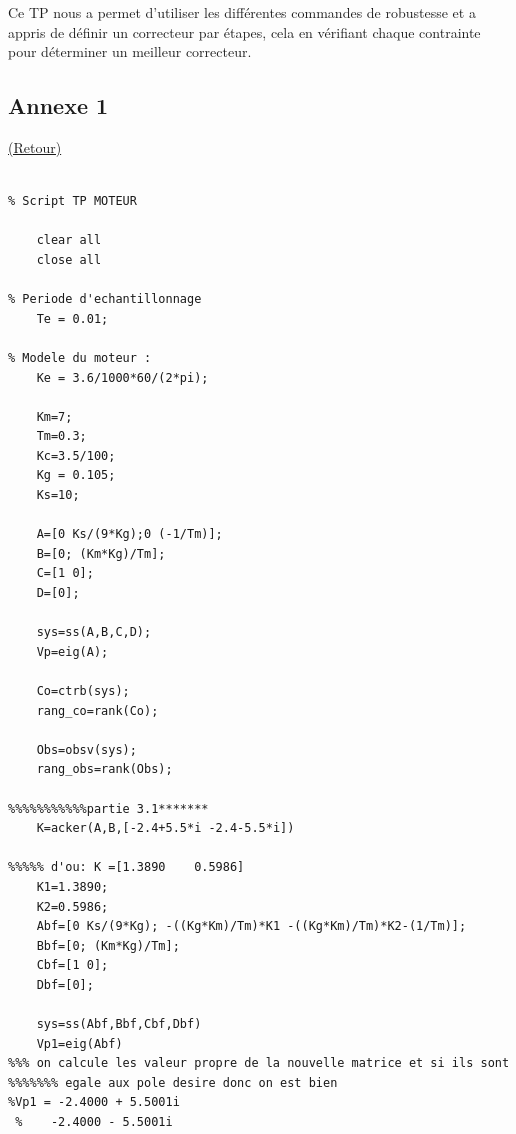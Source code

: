 \documentclass[12pt, a4paper, openany]{report}
\begin{document}
Ce TP nous a permet d'utiliser les différentes commandes de robustesse et a appris de définir un correcteur par étapes, cela en vérifiant chaque contrainte pour déterminer un meilleur correcteur.\\










\begin{appendices}
\chapter*{Annexe 1}
	\hyperref[annexe1]{(Retour)}\label{section1.1}
	
	
\begin{lstlisting}
	
% Script TP MOTEUR

	clear all
	close all

% Periode d'echantillonnage
	Te = 0.01;

% Modele du moteur :
	Ke = 3.6/1000*60/(2*pi);

	Km=7;
	Tm=0.3;
	Kc=3.5/100;
	Kg = 0.105;
	Ks=10;

	A=[0 Ks/(9*Kg);0 (-1/Tm)];
	B=[0; (Km*Kg)/Tm];
	C=[1 0];
	D=[0];

	sys=ss(A,B,C,D);
	Vp=eig(A);

	Co=ctrb(sys);
	rang_co=rank(Co);

	Obs=obsv(sys);
	rang_obs=rank(Obs);

%%%%%%%%%%%partie 3.1*******
	K=acker(A,B,[-2.4+5.5*i -2.4-5.5*i])

%%%%% d'ou: K =[1.3890    0.5986]
	K1=1.3890;
	K2=0.5986;
	Abf=[0 Ks/(9*Kg); -((Kg*Km)/Tm)*K1 -((Kg*Km)/Tm)*K2-(1/Tm)];
	Bbf=[0; (Km*Kg)/Tm];
	Cbf=[1 0];
	Dbf=[0];

	sys=ss(Abf,Bbf,Cbf,Dbf)
	Vp1=eig(Abf)
%%% on calcule les valeur propre de la nouvelle matrice et si ils sont
%%%%%%% egale aux pole desire donc on est bien 
%Vp1 = -2.4000 + 5.5001i
 %    -2.4000 - 5.5001i
		
			    			
	\end{lstlisting}	
				
\end{appendices}





%
%
\end{document}
